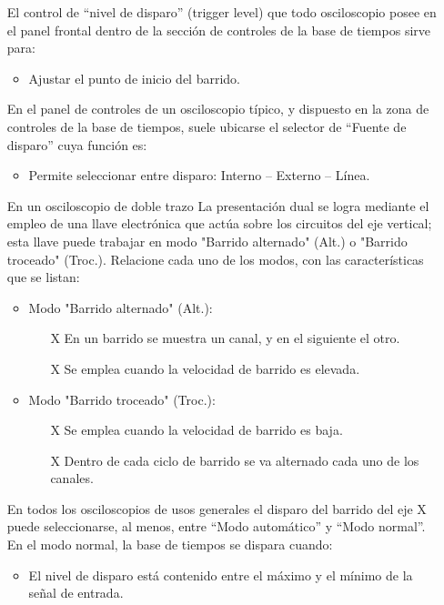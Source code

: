 \begin{itemize}
    \item [] El control de “nivel de disparo” (trigger level) que todo osciloscopio posee en el panel frontal dentro de la sección de controles de la base de tiempos sirve para:
    \begin{itemize}
        \item Ajustar el punto de inicio del barrido.
    \end{itemize}
    \item [] En el panel de controles de un osciloscopio típico, y dispuesto en la zona de controles de la base de tiempos, suele ubicarse el selector de “Fuente de disparo” cuya función es:
    \begin{itemize}
        \item Permite seleccionar entre disparo: Interno – Externo – Línea.
    \end{itemize}
    \item[] En un osciloscopio de doble trazo La presentación dual se logra mediante el empleo de una llave electrónica que actúa sobre los circuitos del eje vertical; esta llave puede trabajar en modo "Barrido alternado" (Alt.) o "Barrido troceado" (Troc.). Relacione cada uno de los modos, con las características que se listan:
    \begin{itemize}
        \item Modo "Barrido alternado" (Alt.):
        \begin{itemize}
            \item[X] En un barrido se muestra un canal, y en el siguiente el otro.
            \item[X] Se emplea cuando la velocidad de barrido es elevada.
        \end{itemize}
        \item Modo "Barrido troceado" (Troc.):
        \begin{itemize}
            \item[X] Se emplea cuando la velocidad de barrido es baja.
            \item[X] Dentro de cada ciclo de barrido se va alternado cada uno de los canales.
        \end{itemize}
    \end{itemize}
    \item[]En todos los osciloscopios de usos generales el disparo del barrido del eje X puede seleccionarse, al menos, entre “Modo automático” y “Modo normal”. En el modo normal, la base de tiempos se dispara cuando:
    \begin{itemize}
        \item El nivel de disparo está contenido entre el máximo y el mínimo de la señal de entrada.


\end{itemize}
\end{itemize}
